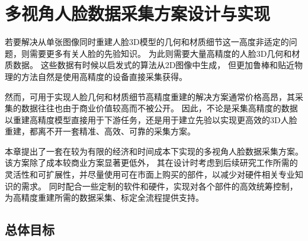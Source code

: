 \chapter{多视角人脸数据采集方案设计与实现}
\label{chap:platform}

若要解决从单张图像同时重建人脸3D模型的几何和材质细节这一高度非适定的问题，则需要更多有关人脸的先验知识。
为此则需要大量高精度的人脸3D几何和材质数据。
这些数据有时候以启发式的算法从2D图像中生成，
但更加鲁棒和贴近物理的方法自然是使用高精度的设备直接采集获得。

然而，可用于实现人脸几何和材质细节高精度重建的解决方案通常价格高昂，其采集的数据往往也由于商业价值较高而不被公开。
因此，不论是采集高精度的数据以重建高精度模型直接用于下游任务，还是用于建立先验以实现更高效的3D人脸重建，都离不开一套精准、高效、可靠的采集方案。

本章提出了一套在较为有限的经济和时间成本下实现的多视角人脸数据采集方案。
该方案除了成本较商业方案显著更低外，
其在设计时考虑到后续研究工作所需的灵活性和可扩展性，并尽量使用可在市面上购买的部件，以减少对硬件相关专业知识的需求。
同时配合一些定制的软件和硬件，实现对各个部件的高效统筹控制，为高精度重建所需的数据采集、标定全流程提供支持。

\section{总体目标}

